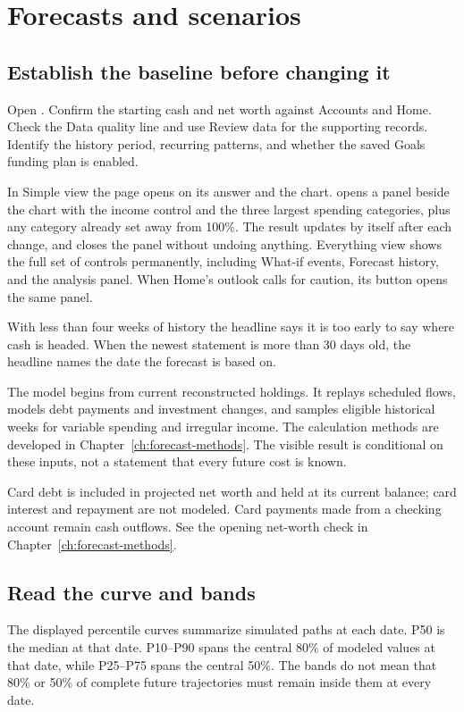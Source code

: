 \chapter{Forecasts and scenarios}\label{ch:forecast}
\section{Establish the baseline before changing it}
Open . Confirm the starting cash and net worth against Accounts and Home. Check the Data quality line and use Review data for the supporting records. Identify the history period, recurring patterns, and whether the saved Goals funding plan is enabled.

In Simple view the page opens on its answer and the chart.  opens a panel beside the chart with the income control and the three largest spending categories, plus any category already set away from 100\%. The result updates by itself after each change, and  closes the panel without undoing anything. Everything view shows the full set of controls permanently, including What-if events, Forecast history, and the analysis panel. When Home's outlook calls for caution, its  button opens the same panel.

With less than four weeks of history the headline says it is too early to say where cash is headed. When the newest statement is more than 30 days old, the headline names the date the forecast is based on.

The model begins from current reconstructed holdings. It replays scheduled flows, models debt payments and investment changes, and samples eligible historical weeks for variable spending and irregular income. The calculation methods are developed in Chapter~\ref{ch:forecast-methods}. The visible result is conditional on these inputs, not a statement that every future cost is known.

Card debt is included in projected net worth and held at its current balance; card interest and repayment are not modeled. Card payments made from a checking account remain cash outflows. See the opening net-worth check in Chapter~\ref{ch:forecast-methods}.

\section{Read the curve and bands}
The displayed percentile curves summarize simulated paths at each date. P50 is the median at that date. P10--P90 spans the central 80\% of modeled values at that date, while P25--P75 spans the central 50\%. The bands do not mean that 80\% or 50\% of complete future trajectories must remain inside them at every date.

